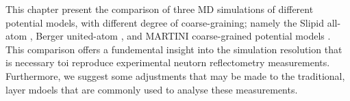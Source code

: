 This chapter present the comparison of three MD simulations of different potential models, with different degree of coarse-graining; namely the Slipid all-atom \cite{jambeck_derivation_2012}, Berger united-atom \cite{berger_molecular_1997}, and MARTINI coarse-grained potential models \cite{marrink_martini_2007}.
This comparison offers a fundemental insight into the simulation resolution that is necessary toi reproduce experimental neutorn reflectometry measurements.
Furthermore, we suggest some adjustments that may be made to the traditional, layer mdoels that are commonly used to analyse these measurements.
